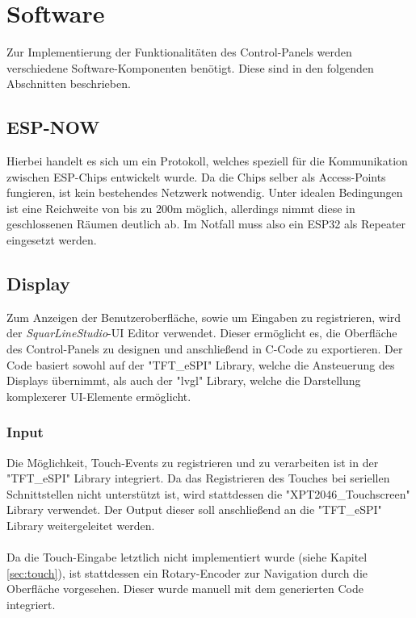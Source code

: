 \section{Software}
Zur Implementierung der Funktionalitäten des Control-Panels werden
verschiedene Software-Komponenten benötigt. Diese sind in den 
folgenden Abschnitten beschrieben.

    \subsection{ESP-NOW}
    Hierbei handelt es sich um ein Protokoll, welches
    speziell für die Kommunikation zwischen ESP-Chips
    entwickelt wurde. Da die Chips selber als Access-Points
    fungieren, ist kein bestehendes Netzwerk notwendig. Unter 
    idealen Bedingungen ist eine Reichweite von bis zu 200m 
    möglich, allerdings nimmt diese in geschlossenen Räumen
    deutlich ab. Im Notfall muss also ein ESP32 als Repeater
    eingesetzt werden. \cite{ESP-NOW-Reliability}
    
    \subsection{Display} 
    Zum Anzeigen der Benutzeroberfläche, sowie um Eingaben zu 
    registrieren, wird der \textit{SquarLineStudio}-UI Editor verwendet.
    Dieser ermöglicht es, die Oberfläche des Control-Panels zu
    designen und anschließend in C-Code zu exportieren.
    Der Code basiert sowohl auf der "TFT\_eSPI" \space Library, welche die
    Ansteuerung des Displays übernimmt, als auch der "lvgl" \space Library,
    welche die Darstellung komplexerer UI-Elemente ermöglicht.

    \subsubsection{Input}
    Die Möglichkeit, Touch-Events zu registrieren und zu verarbeiten ist 
    in der "TFT\_eSPI" \space Library integriert. 
    Da das Registrieren des Touches bei seriellen Schnittstellen nicht unterstützt 
    ist, wird stattdessen die "XPT2046\_Touchscreen" Library verwendet. 
    Der Output dieser soll anschließend an die "TFT\_eSPI" Library weitergeleitet
    werden.
    \\~\\
    Da die Touch-Eingabe letztlich nicht implementiert wurde 
    (siehe Kapitel \ref{sec:touch}), ist stattdessen ein Rotary-Encoder
    zur Navigation durch die Oberfläche vorgesehen. Dieser wurde manuell 
    mit dem generierten Code integriert.
